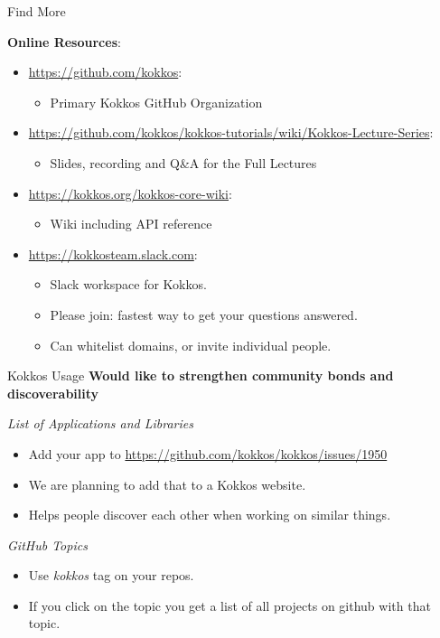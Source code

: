 \begin{frame}{Find More}

  \textbf{Online Resources}:

  \begin{itemize}
    \item \url{https://github.com/kokkos}:
          \begin{itemize}
            \item Primary Kokkos GitHub Organization
          \end{itemize}
    \item \url{https://github.com/kokkos/kokkos-tutorials/wiki/Kokkos-Lecture-Series}:
          \begin{itemize}
            \item{Slides, recording and Q\&A for the Full Lectures}
          \end{itemize}
    \item \url{https://kokkos.org/kokkos-core-wiki}:
          \begin{itemize}
            \item Wiki including API reference
          \end{itemize}
    \item \url{https://kokkosteam.slack.com}:
          \begin{itemize}
            \item Slack workspace for Kokkos.
            \item Please join: fastest way to get your questions answered.
            \item Can whitelist domains, or invite individual people.
          \end{itemize}
  \end{itemize}

\end{frame}

\begin{frame}[fragile]{Kokkos Usage}
  \textbf{Would like to strengthen community bonds and discoverability}

  \vspace{10pt}
  \textit{List of Applications and Libraries}
  \begin{itemize}
    \item Add your app to \url{https://github.com/kokkos/kokkos/issues/1950}
    \item We are planning to add that to a Kokkos website.
    \item Helps people discover each other when working on similar things.
  \end{itemize}

  \vspace{10pt}
  \textit{GitHub Topics}
  \begin{itemize}
    \item Use \textit{kokkos} tag on your repos.
    \item If you click on the topic you get a list of all projects on github with that topic.
  \end{itemize}
\end{frame}

